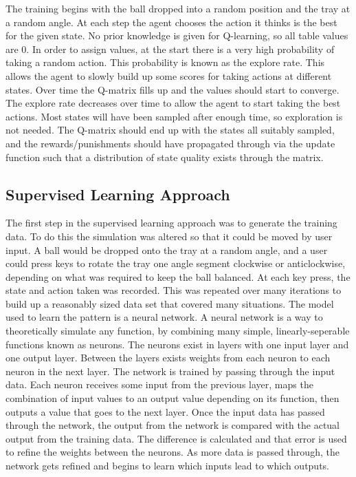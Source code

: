 \documentclass[12pt,a4paper]{article}
\begin{document}
The training begins with the ball dropped into a random position and the tray at a random angle. At each step the agent chooses the action it thinks is the best for the given state. No prior knowledge is given for Q-learning, so all table values are 0. In order to assign values, at the start there is a very high probability of taking a random action. This probability is known as the explore rate. This allows the agent to slowly build up some scores for taking actions at different states. Over time the Q-matrix fills up and the values should start to converge. The explore rate decreases over time to allow the agent to start taking the best actions. Most states will have been sampled after enough time, so exploration is not needed. The Q-matrix should end up with the states all suitably sampled, and the rewards/punishments should have propagated through via the update function such that a distribution of state quality exists through the matrix. 
\subsection{Supervised Learning Approach}
The first step in the supervised learning approach was to generate the training data. To do this the simulation was altered so that it could be moved by user input. A ball would be dropped onto the tray at a random angle, and a user could press keys to rotate the tray one angle segment clockwise or anticlockwise, depending on what was required to keep the ball balanced. At each key press, the state and action taken was recorded. This was repeated over many iterations to build up a reasonably sized data set that covered many situations. 
The model used to learn the pattern is a neural network. A neural network is a way to theoretically simulate any function, by combining many simple, linearly-seperable functions known as neurons. The neurons exist in layers with one input layer and one output layer. Between the layers exists weights from each neuron to each neuron in the next layer. The network is trained by passing through the input data. Each neuron receives some input from the previous layer, maps the combination of input values to an output value depending on its function, then outputs a value that goes to the next layer. Once the input data has passed through the network, the output from the network is compared with the actual output from the training data. The difference is calculated and that error is used to refine the weights between the neurons. As more data is passed through, the network gets refined and begins to learn which inputs lead to which outputs.
\end{document}
